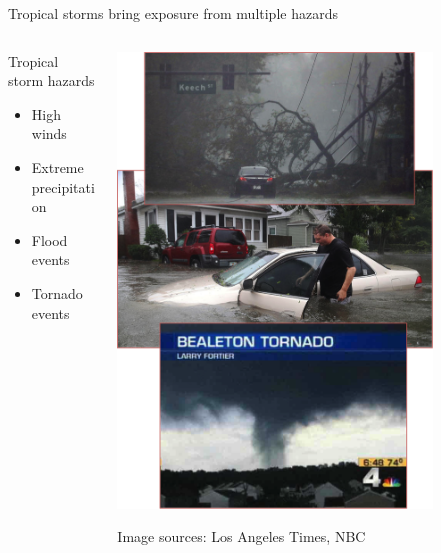 \documentclass[ignorenonframetext,]{beamer}
\begin{document}
\begin{frame}{Tropical storms bring exposure from multiple hazards}

\begin{columns}
\begin{column}{0.5\textwidth}
\begin{block}{Tropical storm hazards}
   \begin{itemize}
    \item High winds
    \item Extreme precipitation
    \item Flood events
    \item Tornado events
   \end{itemize}
\end{block}
\end{column}
\begin{column}{0.5\textwidth}  
    \vspace{-0.25cm}
    \begin{center}
     \includegraphics[width=0.8\textwidth]{storm_hazards.png}
     \end{center}
     \vspace{-0.25cm}
     \scriptsize{Image sources: Los Angeles Times, NBC}
\end{column}
\end{columns}

\end{frame}
\end{document}
